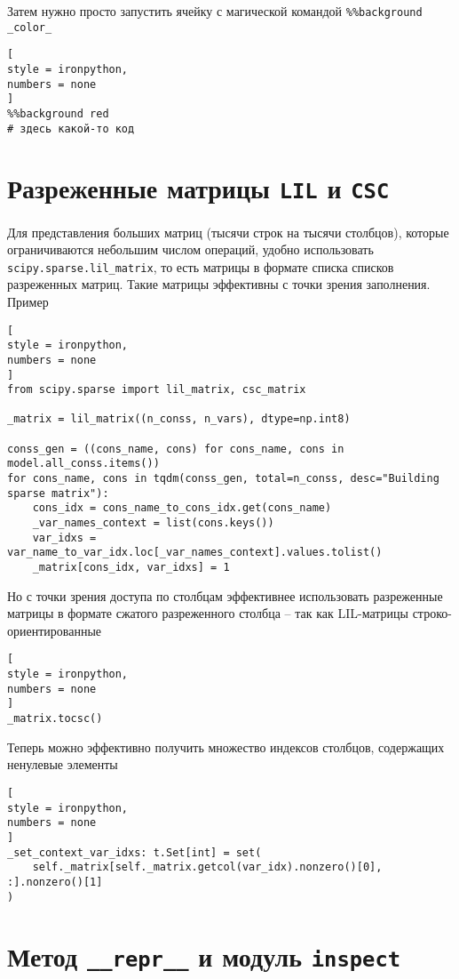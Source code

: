 \documentclass[%
	11pt,
	a4paper,
	utf8,
		]{article}
\begin{document}
Затем нужно просто запустить ячейку с магической командой \verb|%%background _color_|
\begin{lstlisting}[
style = ironpython,
numbers = none
]
%%background red
# здесь какой-то код
\end{lstlisting}

\section{Разреженные матрицы \texttt{LIL} и \texttt{CSC}}

Для представления больших матриц (тысячи строк на тысячи столбцов), которые ограничиваются небольшим числом операций, удобно использовать \verb|scipy.sparse.lil_matrix|, то есть матрицы в формате списка списков разреженных матриц. Такие матрицы эффективны с точки зрения заполнения. Пример
\begin{lstlisting}[
style = ironpython,
numbers = none
]
from scipy.sparse import lil_matrix, csc_matrix

_matrix = lil_matrix((n_conss, n_vars), dtype=np.int8)

conss_gen = ((cons_name, cons) for cons_name, cons in model.all_conss.items())
for cons_name, cons in tqdm(conss_gen, total=n_conss, desc="Building sparse matrix"):
	cons_idx = cons_name_to_cons_idx.get(cons_name)
	_var_names_context = list(cons.keys())
	var_idxs = var_name_to_var_idx.loc[_var_names_context].values.tolist()
	_matrix[cons_idx, var_idxs] = 1
\end{lstlisting}

Но с точки зрения доступа по столбцам эффективнее использовать разреженные матрицы в формате сжатого разреженного столбца -- так как LIL-матрицы строко-ориентированные
\begin{lstlisting}[
style = ironpython,
numbers = none
]
_matrix.tocsc()
\end{lstlisting}

Теперь можно эффективно получить множество индексов столбцов, содержащих ненулевые элементы
\begin{lstlisting}[
style = ironpython,
numbers = none
]
_set_context_var_idxs: t.Set[int] = set(
    self._matrix[self._matrix.getcol(var_idx).nonzero()[0], :].nonzero()[1]
)
\end{lstlisting}





\section{Метод \texttt{\_\_repr\_\_} и модуль \texttt{inspect}}
\end{document}
